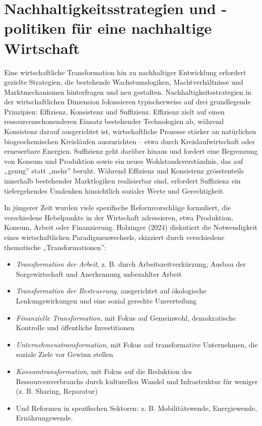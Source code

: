 \documentclass[
  nswissgerman,
  a4paper,
  DIV=11,
  numbers=noendperiod,
  oneside,
  openany]{scrreprt}
\begin{document}
\section{Nachhaltigkeitsstrategien und -politiken für eine nachhaltige
Wirtschaft}\label{nachhaltigkeitsstrategien-und--politiken-fuxfcr-eine-nachhaltige-wirtschaft}

Eine wirtschaftliche Transformation hin zu nachhaltiger Entwicklung
erfordert gezielte Strategien, die bestehende Wachstumslogiken,
Machtverhältnisse und Marktmechanismen hinterfragen und neu gestalten.
Nachhaltigkeitsstrategien in der wirtschaftlichen Dimension fokussieren
typischerweise auf drei grundlegende Prinzipien: Effizienz, Konsistenz
und Suffizienz. Effizienz zielt auf einen ressourcenschonenderen Einsatz
bestehender Technologien ab, während Konsistenz darauf ausgerichtet ist,
wirtschaftliche Prozesse stärker an natürlichen biogeochemischen
Kreisläufen auszurichten -- etwa durch Kreislaufwirtschaft oder
erneuerbare Energien. Suffizienz geht darüber hinaus und fordert eine
Begrenzung von Konsum und Produktion sowie ein neues
Wohlstandsverständnis, das auf „genug'' statt „mehr'' beruht. Während
Effizienz und Konsistenz grösstenteils innerhalb bestehender
Marktlogiken realisierbar sind, erfordert Suffizienz ein tiefergehendes
Umdenken hinsichtlich sozialer Werte und Gerechtigkeit.

In jüngerer Zeit wurden viele spezifische Reformvorschläge formuliert,
die verschiedene Hebelpunkte in der Wirtschaft adressieren, etwa
Produktion, Konsum, Arbeit oder Finanzierung. Holzinger (2024)
diskutiert die Notwendigkeit eines wirtschaftlichen Paradigmenwechsels,
skizziert durch verschiedene thematische „Transformationen'':

\begin{itemize}
\item
  \emph{Transformation der Arbeit}, z. B. durch Arbeitszeitverkürzung,
  Ausbau der Sorgewirtschaft und Anerkennung unbezahlter Arbeit
\item
  \emph{Transformation der Besteuerung}, ausgerichtet auf ökologische
  Lenkungswirkungen und eine sozial gerechte Umverteilung
\item
  \emph{Finanzielle Transformation}, mit Fokus auf Gemeinwohl,
  demokratische Kontrolle und öffentliche Investitionen
\item
  \emph{Unternehmenstransformation}, mit Fokus auf transformative
  Unternehmen, die soziale Ziele vor Gewinn stellen
\item
  \emph{Konsumtransformation}, mit Fokus auf die Reduktion des
  Ressourcenverbrauchs durch kulturellen Wandel und Infrastruktur für
  weniger (z. B. Sharing, Reparatur)
\item
  Und Reformen in spezifischen Sektoren: z. B. Mobilitätswende,
  Energiewende, Ernährungswende.
\end{itemize}
\end{document}
